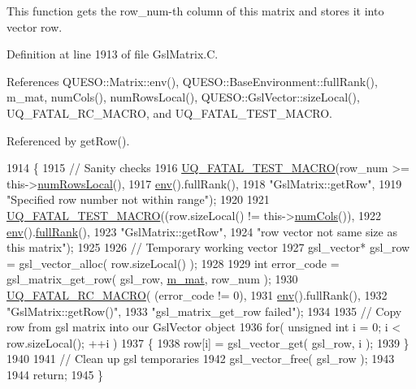 This function gets the row\-\_\-num-\/th column of {\ttfamily this} matrix and stores it into vector {\ttfamily row}. 



Definition at line 1913 of file Gsl\-Matrix.\-C.



References Q\-U\-E\-S\-O\-::\-Matrix\-::env(), Q\-U\-E\-S\-O\-::\-Base\-Environment\-::full\-Rank(), m\-\_\-mat, num\-Cols(), num\-Rows\-Local(), Q\-U\-E\-S\-O\-::\-Gsl\-Vector\-::size\-Local(), U\-Q\-\_\-\-F\-A\-T\-A\-L\-\_\-\-R\-C\-\_\-\-M\-A\-C\-R\-O, and U\-Q\-\_\-\-F\-A\-T\-A\-L\-\_\-\-T\-E\-S\-T\-\_\-\-M\-A\-C\-R\-O.



Referenced by get\-Row().


\begin{DoxyCode}
1914 \{
1915   \textcolor{comment}{// Sanity checks}
1916   \hyperlink{_defines_8h_a56d63d18d0a6d45757de47fcc06f574d}{UQ\_FATAL\_TEST\_MACRO}(row\_num >= this->\hyperlink{class_q_u_e_s_o_1_1_gsl_matrix_ab5ec937a9fd439eef1a87e12c0dbccb4}{numRowsLocal}(),
1917                       \hyperlink{class_q_u_e_s_o_1_1_matrix_a1eefeca9f35200e8275fb0fdfa0c8684}{env}().fullRank(),
1918                       \textcolor{stringliteral}{"GslMatrix::getRow"},
1919                       \textcolor{stringliteral}{"Specified row number not within range"});
1920 
1921   \hyperlink{_defines_8h_a56d63d18d0a6d45757de47fcc06f574d}{UQ\_FATAL\_TEST\_MACRO}((row.sizeLocal() != this->\hyperlink{class_q_u_e_s_o_1_1_gsl_matrix_ad5005f168fe030468e834776afb1859b}{numCols}()),
1922                       \hyperlink{class_q_u_e_s_o_1_1_matrix_a1eefeca9f35200e8275fb0fdfa0c8684}{env}().\hyperlink{class_q_u_e_s_o_1_1_base_environment_a84a239e42ae443cf71db6e03e8159620}{fullRank}(),
1923                       \textcolor{stringliteral}{"GslMatrix::getRow"},
1924                       \textcolor{stringliteral}{"row vector not same size as this matrix"});
1925 
1926   \textcolor{comment}{// Temporary working vector}
1927   gsl\_vector* gsl\_row = gsl\_vector\_alloc( row.sizeLocal() );
1928 
1929   \textcolor{keywordtype}{int} error\_code = gsl\_matrix\_get\_row( gsl\_row, \hyperlink{class_q_u_e_s_o_1_1_gsl_matrix_a2cac0bd065e280a06445f944d5f3e3b3}{m\_mat}, row\_num );
1930   \hyperlink{_defines_8h_aa9107e1a9a5197371a412db3fa349988}{UQ\_FATAL\_RC\_MACRO}( (error\_code != 0),
1931                      \hyperlink{class_q_u_e_s_o_1_1_matrix_a1eefeca9f35200e8275fb0fdfa0c8684}{env}().fullRank(),
1932                      \textcolor{stringliteral}{"GslMatrix::getRow()"},
1933                      \textcolor{stringliteral}{"gsl\_matrix\_get\_row failed"});
1934 
1935   \textcolor{comment}{// Copy row from gsl matrix into our GslVector object}
1936   \textcolor{keywordflow}{for}( \textcolor{keywordtype}{unsigned} \textcolor{keywordtype}{int} i = 0; i < row.sizeLocal(); ++i )
1937     \{
1938       row[i] = gsl\_vector\_get( gsl\_row, i );
1939     \}
1940 
1941   \textcolor{comment}{// Clean up gsl temporaries}
1942   gsl\_vector\_free( gsl\_row );
1943 
1944   \textcolor{keywordflow}{return};
1945 \}
\end{DoxyCode}
